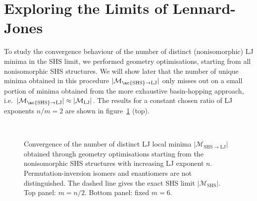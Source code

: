 \section{Exploring the Limits of Lennard-Jones}

To study the convergence behaviour of the number of distinct (nonisomorphic) LJ minima in
the \ac{SHS} limit, we performed geometry optimisations,
starting from all nonisomorphic \ac{SHS} structures.  We will show later that the
number of unique minima obtained in this procedure $|\mathcal{M}_\mathrm{\ac{SHS}\to
LJ}|$ only misses out on a small portion of minima obtained from the more exhaustive
basin-hopping approach, i.e.~$|\mathcal{M}_\mathrm{\ac{SHS}\to
LJ}|\approx|\mathcal{M}_\mathrm{LJ}|$.  The results for a constant chosen ratio
of LJ exponents $n/m=2$ are shown in figure~\ref{fig:expinfty} (top). 
\begin{figure}
    \centering
    \\
    \caption{
    Convergence of the number of distinct LJ local minima
    $|\mathcal{M}_\mathrm{SHS\to LJ}|$ obtained through geometry
    optimisations starting from the nonisomorphic \acs{SHS} structures with
    increasing LJ exponent $n$.  Permutation-inversion isomers and enantiomers
    are not distinguished.     The dashed line gives the exact \acs{SHS} limit
    $|\mathcal{M}_\mathrm{SHS}|$.  Top panel: $m=n/2$. Bottom panel: fixed
    $m=6$.}
    \label{fig:expinfty}
\end{figure}

